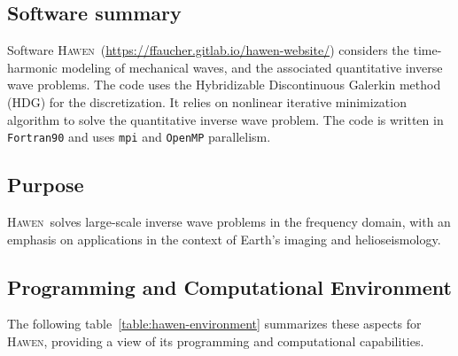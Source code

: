 \newcommand{\hawen}{\textsc{Hawen}}
\subsection{Software summary}
\label{sec:Hawen:summary}

Software \hawen~(\url{https://ffaucher.gitlab.io/hawen-website/})
considers the time-harmonic modeling of mechanical waves, and the 
associated quantitative inverse wave problems.
The code uses the Hybridizable Discontinuous Galerkin method (HDG) 
for the discretization. 
It relies on nonlinear iterative minimization algorithm to solve 
the quantitative inverse wave problem.
The code is written in \texttt{Fortran90} and uses \texttt{mpi}
and \texttt{OpenMP} parallelism.



\subsection{Purpose}
\label{sec:Hawen:purpose}

\hawen~solves large-scale inverse wave problems in the frequency domain, 
with an emphasis on applications in the context of Earth's imaging and helioseismology.


\subsection{Programming and Computational Environment}
\label{sec::Hawen:environment_capabilities}


The following table~\ref{table:hawen-environment} summarizes these aspects for \hawen, providing a  view of its programming and computational capabilities.

